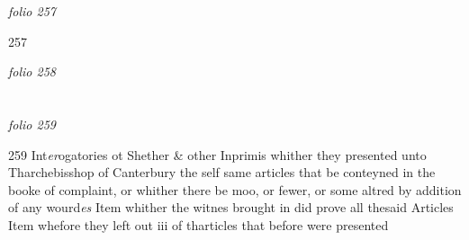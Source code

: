 \documentclass[12pt, a4paper]{book}
\begin{document}
\textit{folio 257}


{\color{Mahogany}257}

\dotfill
					

\textit{folio 258}


         \vspace{4cm}
         
\dotfill
					  \section*{}  \subsection*{}

\textit{folio 259}



{\color{Mahogany}259} Int\textit{er}ogatories ot Shether \& other 
				\marginpar[\vspace{0.5cm}{\textcolor{Gray}{1}}]{}
			 Inprimis whither they presented unto Tharchebisshop of Canterbury the self same articles that be conteyned in the booke of complaint, or whither there be moo, or fewer, or some altred by addition of any wourd\textit{es} 
				\marginpar[\vspace{0.5cm}{\textcolor{Gray}{2}}]{}
			 Item whither the witnes brought in did prove all thesaid Articles 
				\marginpar[\vspace{0.5cm}{\textcolor{Gray}{3}}]{}
			 Item whefore they left out iii of tharticles that before were presented
			 
\end{document}
